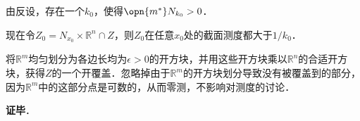 由反设，存在一个$k_0$，使得$\opn{m^*}N_{k_0}>0$．

现在令$Z_0=N_{x_0}\times\mathbb{R}^n \cap Z$，则$Z_0$在任意$x_0$处的截面测度都大于$1/k_0$．



将$\mathbb{R}^m$均匀划分为各边长均为$\epsilon>0$的开方块，并用这些开方块乘以$\mathbb{R}^n$的合适开方块，获得$Z$的一个开覆盖．忽略掉由于$\mathbb{R}^m$的开方块划分导致没有被覆盖到的部分，因为$\mathbb{R}^m$中的这部分点是可数的，从而零测，不影响对测度的讨论．



\textbf{证毕}．
















